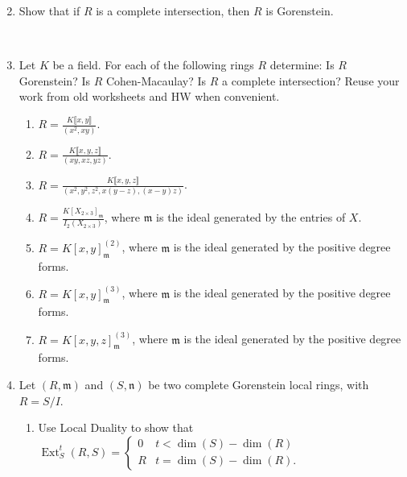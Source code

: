 \documentclass[11pt]{book}
\numberwithin{equation}{section}
\numberwithin{theorem}{chapter}
\theoremstyle{definition}
\newtheorem*{basic properties}{Basic Properties}
\newtheorem*{Important Remark}{Important Remark}
\theoremstyle{remark}
\newcommand{\m}{\mathfrak{m}}
\newcommand{\n}{\mathfrak{n}}
\newcommand{\Ext}{\operatorname{Ext}}
\renewcommand{\dim}{\operatorname{dim}}
\begin{document}
\begin{enumerate}\setcounter{enumi}{1}
	
	\item Show that if $R$ is a complete intersection, then $R$ is Gorenstein.
	
	\
	
	\item Let $K$ be a field. For each of the following rings $R$ determine: Is $R$ Gorenstein? Is $R$ Cohen-Macaulay? Is $R$ a complete intersection? Reuse your work from old worksheets and HW when convenient.
	

	
	\begin{enumerate}
		
		\item  $\displaystyle R=\frac{K\llbracket x,y \rrbracket}{(x^2,xy)}$.
		
		
		
		\item  $\displaystyle R=\frac{K\llbracket x,y,z \rrbracket}{(xy,xz,yz)}$.
		
		
		
		\item  $\displaystyle R=\frac{K\llbracket x,y,z \rrbracket}{(x^2,y^2,z^2,x(y-z),(x-y)z)}$.
		
		
		
		\item  $\displaystyle R=\frac{K[X_{2\times 3}]_{\m}}{I_2(X_{2\times 3})}$, where $\m$ is the ideal generated by the entries of $X$.
		
		
		
		\item $\displaystyle R=K[x,y]^{(2)}_{\m}$, where $\m$ is the ideal generated by the positive degree forms.
		
		
		
		\item $\displaystyle R=K[x,y]^{(3)}_{\m}$, where $\m$ is the ideal generated by the positive degree forms.
		
		
		
		\item $\displaystyle R=K[x,y,z]^{(3)}_{\m}$, where $\m$ is the ideal generated by the positive degree forms.
		
	\end{enumerate}
	
	
	
	\item Let $(R,\m)$ and $(S,\n)$ be two complete Gorenstein local rings, with $R=S/I$.
	\begin{enumerate}
		\item Use Local Duality to show that $\Ext^t_S(R,S)=\begin{cases} 0 & t<\dim(S)-\dim(R) \\
		R & t=\dim(S)-\dim(R). \end{cases}$
		

\end{enumerate}
\end{enumerate}
\end{document}
